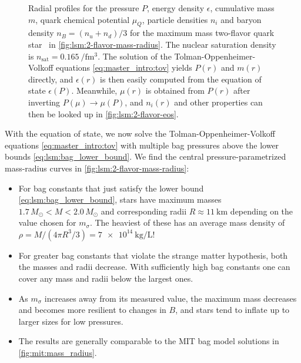 \begin{figure}[p]
{	Radial profiles for the
	pressure $P$,
	energy density $\epsilon$,
	cumulative mass $m$,
	quark chemical potential $\mu_Q$,
	particle densities $n_i$
	and baryon density $n_B = (n_u+n_d)/3$
	for the maximum mass two-flavor quark star \goldenstar in \cref{fig:lsm:2-flavor-mass-radius}.
	The nuclear saturation density is $n_\text{sat} = \SI{0.165}{\per\femto\meter\cubed}$.
	The solution of the Tolman-Oppenheimer-Volkoff equations \eqref{eq:master_intro:tov} yields $P(r)$ and $m(r)$ directly,
	and $\epsilon(r)$ is then easily computed from the equation of state $\epsilon(P)$.
	Meanwhile, $\mu(r)$ is obtained from $P(r)$ after inverting $P(\mu) \rightarrow \mu(P)$,
	and $n_i(r)$ and other properties can then be looked up in \cref{fig:lsm:2-flavor-eos}.
}
\end{figure}

With the equation of state, we now solve the Tolman-Oppenheimer-Volkoff equations \eqref{eq:master_intro:tov} with multiple bag pressures above the lower bounds \eqref{eq:lsm:bag_lower_bound}.
We find the central pressure-parametrized mass-radius curves in \cref{fig:lsm:2-flavor-mass-radius}:
\begin{itemize}
\item For bag constants that just satisfy the lower bound \eqref{eq:lsm:bag_lower_bound},
      stars have maximum masses $1.7 \, M_\odot < M < 2.0 \, M_\odot$ and corresponding radii $R \approx \SI{11}{\kilo\meter}$
      depending on the value chosen for $m_\sigma$.
      The heaviest of these has an average mass density of $\rho = M / (4 \pi R^3/3) = \SI{7e14}{\kilo\gram\per\liter}$!
\item For greater bag constants that violate the strange matter hypothesis, both the masses and radii decrease.
      With sufficiently high bag constants one can cover any mass and radii below the largest ones.
\item As $m_\sigma$ increases away from its measured value,
      the maximum mass decreases and becomes more resilient to changes in $B$, and stars tend to inflate up to larger sizes for low pressures.
\item The results are generally comparable to the MIT bag model solutions in \cref{fig:mit:mass_radius}.
\end{itemize}

